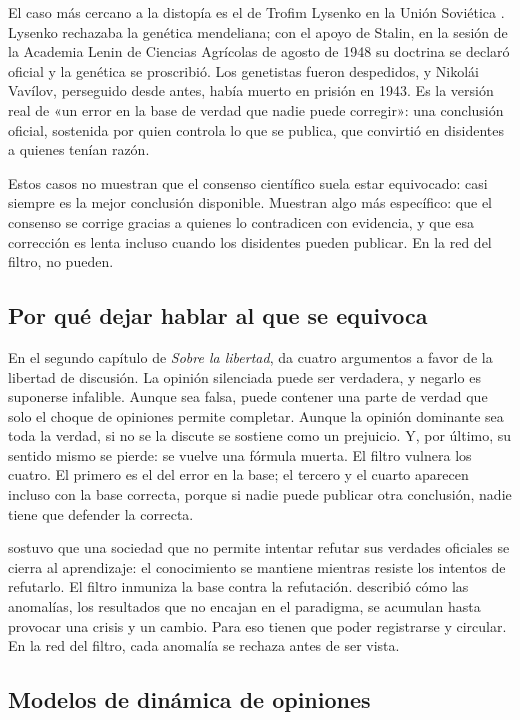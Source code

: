 \documentclass[11pt,a4paper]{article}
\begin{document}
El caso más cercano a la distopía es el de Trofim Lysenko en la Unión Soviética \parencite{medvedev1969}. Lysenko rechazaba la genética mendeliana; con el apoyo de Stalin, en la sesión de la Academia Lenin de Ciencias Agrícolas de agosto de 1948 su doctrina se declaró oficial y la genética se proscribió. Los genetistas fueron despedidos, y Nikolái Vavílov, perseguido desde antes, había muerto en prisión en 1943. Es la versión real de «un error en la base de verdad que nadie puede corregir»: una conclusión oficial, sostenida por quien controla lo que se publica, que convirtió en disidentes a quienes tenían razón.

Estos casos no muestran que el consenso científico suela estar equivocado: casi siempre es la mejor conclusión disponible. Muestran algo más específico: que el consenso se corrige gracias a quienes lo contradicen con evidencia, y que esa corrección es lenta incluso cuando los disidentes pueden publicar. En la red del filtro, no pueden.

\subsection{Por qué dejar hablar al que se equivoca}

En el segundo capítulo de \emph{Sobre la libertad}, \textcite{mill1859} da cuatro argumentos a favor de la libertad de discusión. La opinión silenciada puede ser verdadera, y negarlo es suponerse infalible. Aunque sea falsa, puede contener una parte de verdad que solo el choque de opiniones permite completar. Aunque la opinión dominante sea toda la verdad, si no se la discute se sostiene como un prejuicio. Y, por último, su sentido mismo se pierde: se vuelve una fórmula muerta. El filtro vulnera los cuatro. El primero es el del error en la base; el tercero y el cuarto aparecen incluso con la base correcta, porque si nadie puede publicar otra conclusión, nadie tiene que defender la correcta.

\textcite{popper1945} sostuvo que una sociedad que no permite intentar refutar sus verdades oficiales se cierra al aprendizaje: el conocimiento se mantiene mientras resiste los intentos de refutarlo. El filtro inmuniza la base contra la refutación. \textcite{kuhn1962} describió cómo las anomalías, los resultados que no encajan en el paradigma, se acumulan hasta provocar una crisis y un cambio. Para eso tienen que poder registrarse y circular. En la red del filtro, cada anomalía se rechaza antes de ser vista.

\subsection{Modelos de dinámica de opiniones}
\end{document}
